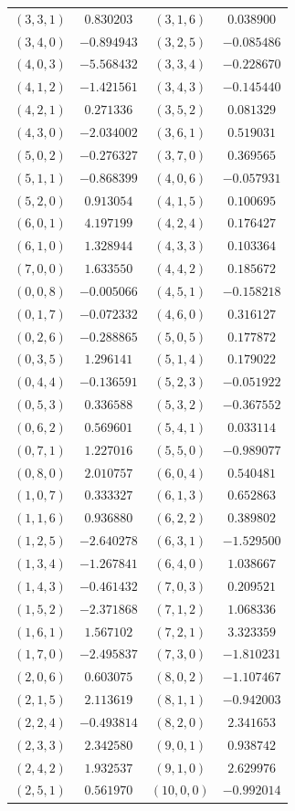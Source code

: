\begin{table}
\begin{tabular}{cc@{\qquad}cc}
$(3,3,1)$ & $0.830203$ & $(3,1,6)$ & $0.038900$ \\
$(3,4,0)$ & $-0.894943$ & $(3,2,5)$ & $-0.085486$ \\
$(4,0,3)$ & $-5.568432$ & $(3,3,4)$ & $-0.228670$ \\
$(4,1,2)$ & $-1.421561$ & $(3,4,3)$ & $-0.145440$ \\
$(4,2,1)$ & $0.271336$ & $(3,5,2)$ & $0.081329$ \\
$(4,3,0)$ & $-2.034002$ & $(3,6,1)$ & $0.519031$ \\
$(5,0,2)$ & $-0.276327$ & $(3,7,0)$ & $0.369565$ \\
$(5,1,1)$ & $-0.868399$ & $(4,0,6)$ & $-0.057931$ \\
$(5,2,0)$ & $0.913054$ & $(4,1,5)$ & $0.100695$ \\
$(6,0,1)$ & $4.197199$ & $(4,2,4)$ & $0.176427$ \\
$(6,1,0)$ & $1.328944$ & $(4,3,3)$ & $0.103364$ \\
$(7,0,0)$ & $1.633550$ & $(4,4,2)$ & $0.185672$ \\
$(0,0,8)$ & $-0.005066$ & $(4,5,1)$ & $-0.158218$ \\
$(0,1,7)$ & $-0.072332$ & $(4,6,0)$ & $0.316127$ \\
$(0,2,6)$ & $-0.288865$ & $(5,0,5)$ & $0.177872$ \\
$(0,3,5)$ & $1.296141$ & $(5,1,4)$ & $0.179022$ \\
$(0,4,4)$ & $-0.136591$ & $(5,2,3)$ & $-0.051922$ \\
$(0,5,3)$ & $0.336588$ & $(5,3,2)$ & $-0.367552$ \\
$(0,6,2)$ & $0.569601$ & $(5,4,1)$ & $0.033114$ \\
$(0,7,1)$ & $1.227016$ & $(5,5,0)$ & $-0.989077$ \\
$(0,8,0)$ & $2.010757$ & $(6,0,4)$ & $0.540481$ \\
$(1,0,7)$ & $0.333327$ & $(6,1,3)$ & $0.652863$ \\
$(1,1,6)$ & $0.936880$ & $(6,2,2)$ & $0.389802$ \\
$(1,2,5)$ & $-2.640278$ & $(6,3,1)$ & $-1.529500$ \\
$(1,3,4)$ & $-1.267841$ & $(6,4,0)$ & $1.038667$ \\
$(1,4,3)$ & $-0.461432$ & $(7,0,3)$ & $0.209521$ \\
$(1,5,2)$ & $-2.371868$ & $(7,1,2)$ & $1.068336$ \\
$(1,6,1)$ & $1.567102$ & $(7,2,1)$ & $3.323359$ \\
$(1,7,0)$ & $-2.495837$ & $(7,3,0)$ & $-1.810231$ \\
$(2,0,6)$ & $0.603075$ & $(8,0,2)$ & $-1.107467$ \\
$(2,1,5)$ & $2.113619$ & $(8,1,1)$ & $-0.942003$ \\
$(2,2,4)$ & $-0.493814$ & $(8,2,0)$ & $2.341653$ \\
$(2,3,3)$ & $2.342580$ & $(9,0,1)$ & $0.938742$ \\
$(2,4,2)$ & $1.932537$ & $(9,1,0)$ & $2.629976$ \\
$(2,5,1)$ & $0.561970$ & $(10,0,0)$ & $-0.992014$ \\
\hline
\end{tabular}
\end{table}
